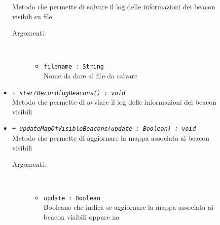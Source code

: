\documentclass[../DefinizioneDiProdotto.tex]{subfiles}
\begin{document}
\begin{description}
\begin{itemize}
		Metodo che permette di salvare il log delle informazioni dei beacon visibili su file
		\begin{description}
			\item[Argomenti:] \
			\begin{itemize}
				\item \texttt{filename : String}\\
				Nome da dare al file da salvare\end{itemize}
		\end{description}
		\item \texttt{+ \textit{startRecordingBeacons() : void}}\\
		Metodo che permette di avviare il log delle informazioni dei beacon visibili
		\item \texttt{+ \textit{updateMapOfVisibleBeacons(update : Boolean) : void}}\\
		Metodo che permette di aggiornare la mappa associata ai beacon visibili
		\begin{description}
			\item[Argomenti:] \
			\begin{itemize}
				\item \texttt{update : Boolean}\\
				Booleano che indica se aggiornare la mappa associata ai beacon visibili oppure no\end{itemize}
		\end{description}
	\end{itemize}
\end{description}
\end{document}
